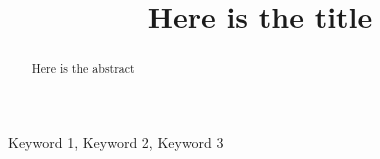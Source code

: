 \documentclass[conference,twocolumn]{IEEEtran} %
\begin{document}
\title{Here is the title}
\author{
}

\maketitle

\begin{abstract}
Here is the abstract
\end{abstract}

\begin{IEEEkeywords}
 Keyword 1, Keyword 2, Keyword 3
\end{IEEEkeywords}








\end{document}
